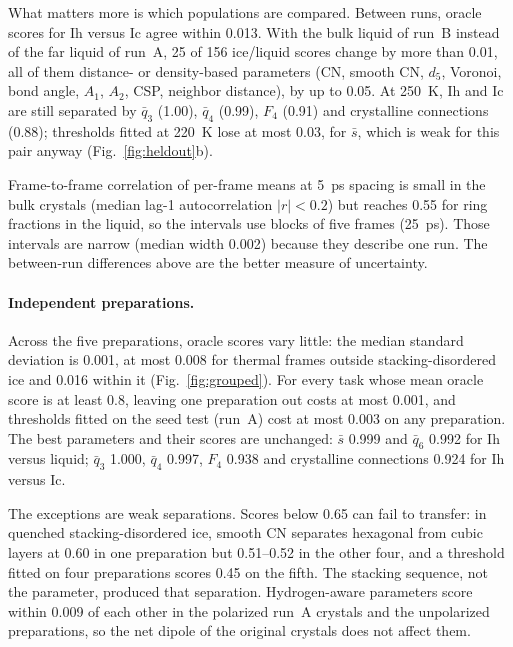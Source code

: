 \documentclass{template1}
\begin{document}
What matters more is which populations are compared. Between runs, oracle
scores for Ih versus Ic agree within 0.013. With the bulk liquid of run~B
instead of the far liquid of run~A, 25 of 156 ice/liquid scores change by
more than 0.01, all of them distance- or density-based parameters (CN, smooth
CN, $d_5$, Voronoi, bond angle, $A_1$, $A_2$, CSP, neighbor distance), by up
to 0.05. At 250~K, Ih and Ic are still separated by $\bar q_3$ (1.00),
$\bar q_4$ (0.99), $F_4$ (0.91) and crystalline connections (0.88);
thresholds fitted at 220~K lose at most 0.03, for $\bar s$, which is weak
for this pair anyway (Fig.~\ref{fig:heldout}b).

Frame-to-frame correlation of per-frame means at 5~ps spacing is small in the
bulk crystals (median lag-1 autocorrelation $|r|<0.2$) but reaches 0.55 for
ring fractions in the liquid, so the intervals use blocks of five frames
(25~ps). Those intervals are narrow (median width 0.002) because they
describe one run. The between-run differences above are the better measure
of uncertainty.

\paragraph{Independent preparations.} Across the five preparations, oracle
scores vary little: the median standard deviation is 0.001, at most 0.008 for
thermal frames outside stacking-disordered ice and 0.016 within it
(Fig.~\ref{fig:grouped}). For every task whose mean oracle score is at least
0.8, leaving one preparation out costs at most 0.001, and thresholds fitted
on the seed test (run~A) cost at most 0.003 on any preparation. The best
parameters and their scores are unchanged: $\bar s$ 0.999 and $\bar q_6$
0.992 for Ih versus liquid; $\bar q_3$ 1.000, $\bar q_4$ 0.997, $F_4$ 0.938
and crystalline connections 0.924 for Ih versus Ic.

The exceptions are weak separations. Scores below 0.65 can fail to transfer:
in quenched stacking-disordered ice, smooth CN separates hexagonal from cubic
layers at 0.60 in one preparation but 0.51--0.52 in the other four, and a
threshold fitted on four preparations scores 0.45 on the fifth. The stacking
sequence, not the parameter, produced that separation. Hydrogen-aware
parameters score within 0.009 of each other in the polarized run~A crystals
and the unpolarized preparations, so the net dipole of the original crystals
does not affect them.
\end{document}
